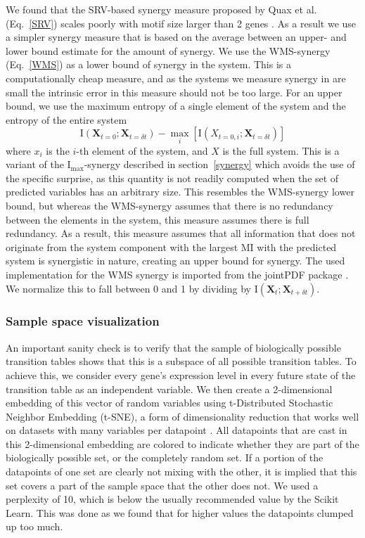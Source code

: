 \documentclass[../main.tex]{subfiles}
\begin{document}
We found that the SRV-based synergy measure proposed by Quax et al. (Eq.~\ref{SRV}) scales poorly with motif size larger than 2 genes \cite{quax2017quantifying}.
As a result we use a simpler synergy measure that is based on the average between an upper- and lower bound estimate for the amount of synergy.
We use the WMS-synergy (Eq.~\ref{WMS}) as a lower bound of synergy in the system.
This is a computationally cheap measure, and as the systems we measure synergy in are small the intrinsic error in this measure should not be too large.
For an upper bound, we use the maximum entropy of a single element of the system and the entropy of the entire system
%
\begin{equation}
\mathrm{I}\left( \mathbf{X}_{t=0}; \mathbf{X}_{t=\delta t} \right) - \max_i [\mathrm{I}\left( X_{t=0,i};\mathbf{X}_{t=\delta t}\right)]
\end{equation}
%
where $x_i$ is the $i$-th element of the system, and $X$ is the full system.
This is a variant of the $\mathrm{I}_\mathrm{max}$-synergy described in section~\ref{synergy} which avoids the use of the specific surprise, as this quantity is not readily computed when the set of predicted variables has an arbitrary size.
This resembles the WMS-synergy lower bound, but whereas the WMS-synergy assumes that there is no redundancy between the elements in the system, this measure assumes there is full redundancy.
As a result, this measure assumes that all information that does not originate from the system component with the largest MI with the predicted system is synergistic in nature, creating an upper bound for synergy.
The used implementation for the WMS synergy is imported from the jointPDF package \cite{jointpdf}.
We normalize this to fall between 0 and 1 by dividing by $\mathrm{I}\left( \mathbf{X}_t ; \mathbf{X}_{t + \delta t}\right)$.

\subsubsection{Sample space visualization}

An important sanity check is to verify that the sample of biologically possible transition tables shows that this is a subspace of all possible transition tables.
To achieve this, we consider every gene's expression level in every future state of the transition table as an independent variable.
We then create a 2-dimensional embedding of this vector of random variables using t-Distributed Stochastic Neighbor Embedding (t-SNE), a form of dimensionality reduction that works well on datasets with many variables per datapoint \cite{maaten2008visualizing}.
All datapoints that are cast in this 2-dimensional embedding are colored to indicate whether they are part of the biologically possible set, or the completely random set.
If a portion of the datapoints of one set are clearly not mixing with the other, it is implied that this set covers a part of the sample space that the other does not.
We used a perplexity of 10, which is below the usually recommended value by the Scikit Learn.
This was done as we found that for higher values the datapoints clumped up too much.
\end{document}
